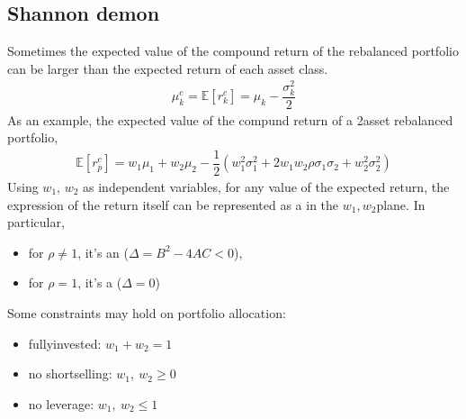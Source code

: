 \documentclass[letterpaper,10pt,english]{jupyterBook}
\begin{document}
\subsection{Shannon demon}
\label{\detokenize{code/notebooks/rebalancing:shannon-demon}}
\sphinxAtStartPar
Sometimes the expected value of the compound return of the rebalanced portfolio can be larger than the expected return of each asset class.
\begin{equation*}
\begin{split}\mu^c_k = \mathbb{E}[r^c_k]  = \mu_k - \dfrac{\sigma_k^2}{2}\end{split}
\end{equation*}
\sphinxAtStartPar
{} As an example, the expected value of the compund return of a 2\sphinxhyphen{}asset rebalanced portfolio,
\begin{equation*}
\begin{split}\mathbb{E} [ r_p^c ] = w_1 \mu_1 + w_2 \mu_2 - \dfrac{1}{2} ( w_1^2 \sigma_1^2 + 2 w_1 w_2 \rho \sigma_1 \sigma_2 + w_2^2 \sigma_2^2 )\end{split}
\end{equation*}
\sphinxAtStartPar
Using \(w_1\), \(w_2\) as independent variables, for any value of the expected return, the expression of the return itself can be represented as a  in the \(w_1,w_2\)\sphinxhyphen{}plane. In particular,
\begin{itemize}
\item {} 
\sphinxAtStartPar
for \(\rho \ne 1\), it’s an  (\(\Delta = B^2 - 4 A C < 0\)),

\item {} 
\sphinxAtStartPar
for \(\rho = 1\), it’s a  (\(\Delta = 0\))

\end{itemize}

\sphinxAtStartPar
{} Some constraints may hold on portfolio allocation:
\begin{itemize}
\item {} 
\sphinxAtStartPar
fully\sphinxhyphen{}invested: \(w_1 + w_2 = 1\)

\item {} 
\sphinxAtStartPar
no short\sphinxhyphen{}selling: \(w_1,\ w_2 \ge 0\)

\item {} 
\sphinxAtStartPar
no leverage: \(w_1, \ w_2 \le 1\)

\end{itemize}
\end{document}

